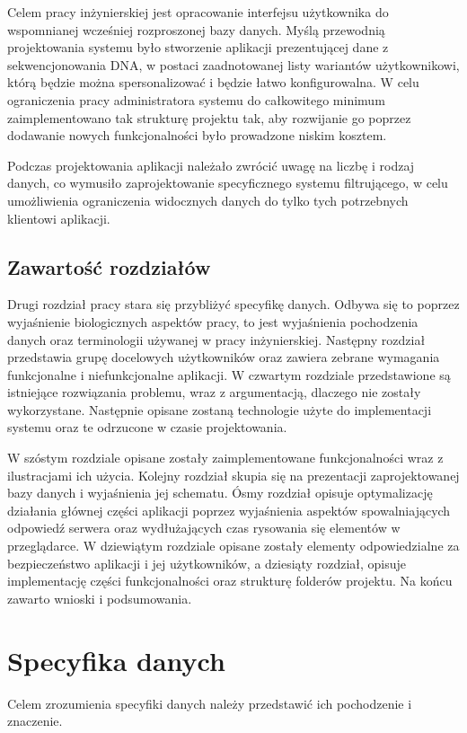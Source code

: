 \documentclass[a4paper,12pt,twoside]{article}
\begin{document}
Celem pracy inżynierskiej jest opracowanie
interfejsu użytkownika do wspomnianej wcześniej
rozproszonej bazy danych.
Myślą przewodnią projektowania systemu było stworzenie aplikacji
prezentującej dane z sekwencjonowania DNA,
w postaci zaadnotowanej listy wariantów użytkownikowi, którą będzie
można spersonalizować i będzie łatwo konfigurowalna.
W celu ograniczenia pracy administratora systemu do
całkowitego minimum zaimplementowano tak strukturę projektu
tak, aby rozwijanie go poprzez dodawanie nowych funkcjonalności było
prowadzone niskim kosztem.

Podczas projektowania aplikacji należało zwrócić uwagę na
liczbę i rodzaj danych, co wymusiło zaprojektowanie specyficznego systemu
filtrującego, w celu umożliwienia ograniczenia widocznych danych
do tylko tych potrzebnych klientowi aplikacji.

\subsection{Zawartość rozdziałów}
Drugi rozdział pracy stara się przybliżyć specyfikę danych.
Odbywa się to poprzez wyjaśnienie biologicznych aspektów pracy, to jest
wyjaśnienia pochodzenia danych oraz terminologii używanej w pracy inżynierskiej.
Następny rozdział przedstawia grupę docelowych użytkowników oraz zawiera zebrane wymagania funkcjonalne i niefunkcjonalne aplikacji.
W czwartym rozdziale przedstawione są istniejące rozwiązania problemu, wraz
z argumentacją, dlaczego nie zostały wykorzystane.
Następnie opisane zostaną technologie użyte do implementacji systemu oraz te odrzucone w czasie projektowania.

W szóstym rozdziale opisane zostały zaimplementowane funkcjonalności
wraz z ilustracjami ich użycia. Kolejny rozdział skupia się
na prezentacji zaprojektowanej bazy danych i wyjaśnienia
jej schematu. Ósmy rozdział opisuje optymalizację działania głównej
części aplikacji poprzez wyjaśnienia aspektów spowalniających
odpowiedź serwera oraz wydłużających czas rysowania się elementów w
przeglądarce.
W dziewiątym rozdziale opisane zostały elementy odpowiedzialne za
bezpieczeństwo aplikacji i jej użytkowników, a dziesiąty rozdział,
opisuje implementację części funkcjonalności oraz strukturę folderów projektu.
Na końcu zawarto wnioski i podsumowania.

\newpage
\section{Specyfika danych}
Celem zrozumienia specyfiki danych należy przedstawić ich pochodzenie
i znaczenie.
\end{document}
